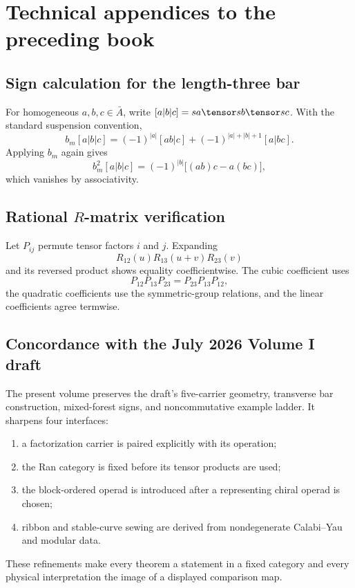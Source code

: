 \part{Technical appendices to the preceding book}
\chapter{Sign calculation for the length-three bar}
For homogeneous $a,b,c\in\bar A$, write $[a|b|c]=sa\tensor sb\tensor sc$. With the standard suspension convention,
\[
 b_m[a|b|c]
 =(-1)^{|a|}[ab|c]
 +(-1)^{|a|+|b|+1}[a|bc].
\]
Applying $b_m$ again gives
\[
 b_m^2[a|b|c]
 =(-1)^{|b|}\bigl[(ab)c-a(bc)\bigr],
\]
which vanishes by associativity.

\chapter{Rational \texorpdfstring{$R$}{R}-matrix verification}
Let $P_{ij}$ permute tensor factors $i$ and $j$. Expanding
\[
 R_{12}(u)R_{13}(u+v)R_{23}(v)
\]
and its reversed product shows equality coefficientwise. The cubic coefficient uses
\[
 P_{12}P_{13}P_{23}=P_{23}P_{13}P_{12},
\]
the quadratic coefficients use the symmetric-group relations, and the linear coefficients agree termwise.

\chapter{Concordance with the July 2026 Volume I draft}
The present volume preserves the draft's five-carrier geometry, transverse bar construction, mixed-forest signs, and noncommutative example ladder. It sharpens four interfaces:
\begin{enumerate}
\item a factorization carrier is paired explicitly with its operation;
\item the Ran category is fixed before its tensor products are used;
\item the block-ordered operad is introduced after a representing chiral operad is chosen;
\item ribbon and stable-curve sewing are derived from nondegenerate Calabi--Yau and modular data.
\end{enumerate}
These refinements make every theorem a statement in a fixed category and every physical interpretation the image of a displayed comparison map.
